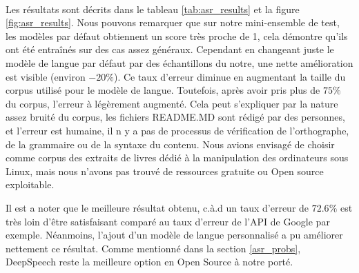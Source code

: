	\paragraph{}
	Les résultats sont décrits dans le tableau \ref{tab:asr_results} et la figure \ref{fig:asr_results}. Nous pouvons remarquer que sur notre mini-ensemble de test, les modèles par défaut obtiennent un score très proche de 1, cela démontre qu'ils ont été entraînés sur des cas assez généraux. Cependant en changeant juste le modèle de langue par défaut par des échantillons du notre, une nette amélioration est visible (environ $-20\%$). Ce taux d'erreur diminue en augmentant la taille du corpus utilisé pour le modèle de langue. Toutefois, après avoir pris plus de $75\%$ du corpus, l'erreur à légèrement augmenté. Cela peut s'expliquer par la nature assez bruité du corpus, les fichiers README.MD sont rédigé par des personnes, et l'erreur est humaine, il n y a pas de processus de vérification de l'orthographe, de la grammaire ou de la syntaxe du contenu. Nous avions envisagé de choisir comme corpus des extraits de livres dédié à la manipulation des ordinateurs sous Linux, mais nous n'avons pas trouvé de ressources gratuite ou Open source exploitable.
	\par
	Il est a noter que le meilleure résultat obtenu, c.à.d un taux d'erreur de $72.6\%$ est très loin d'être satisfaisant comparé au taux d'erreur de l'API de Google par exemple. Néanmoins, l'ajout d'un modèle de langue personnalisé a pu améliorer nettement ce résultat. Comme mentionné dans la section \ref{asr_probs}, DeepSpeech reste la meilleure option en Open Source à notre porté.
	\begin{table}[H]
		\centering
		\caption{Tableau récapitulatif des résultats pour le a reconnaissance automatique de la parole}
		\label{tab:asr_results}
	\end{table}
